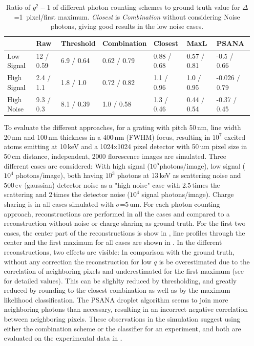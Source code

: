 \begin{table}
	\caption[Ratio of $g^2-1$ of different photon counting schemes to ground truth value]{Ratio of $g^2-1$ of different photon counting schemes to ground truth value  for $\Delta$=1\, pixel/first maximum. \textit{Closest} is \textit{Combination} without considering Noise photons, giving good results in the low noise cases.}
	\label{tab:photonrecon}
	
	\begin{adjustwidth}{-1em}{-2em}	
		\small
		\begin{tabular}{lllllll}
			\toprule
			&        Raw &       Threshold &         Combination &      Closest &         MaxL &          PSANA \\
			\midrule
			Low Signal  &  12 / 0.59 &  6.9 / 0.64 &  0.62 / 0.79 &  0.88 / 0.68 &  0.57 / 0.81 &    -0.5 / 0.66 \\
			High Signal &  2.4 / 1.1 &   1.8 / 1.0 &  0.72 / 0.82 &   1.1 / 0.96 &   1.0 / 0.95 &  -0.026 / 0.79 \\
			High Noise  &  9.3 / 0.3 &  8.1 / 0.39 &   1.0 / 0.58 &   1.3 / 0.46 &  0.44 / 0.54 &   -0.37 / 0.45 \\
			\bottomrule
		\end{tabular}
	\end{adjustwidth}
\end{table}

To evaluate the different approaches, for a grating with pitch 50\,nm, line width 20\,nm and 100\,nm thickness in a 400\,nm (FWHM) focus, resulting in $10^7$ excited atoms emitting at 10\,keV and a 1024x1024 pixel detector with 50\,um pixel size in 50\,cm distance, independent, 2000 florescence images are simulated. Three different cases are considered: With high signal ($10^5 $photons/image), low signal ($10^4$ photons/image), both having $10^3$ photons at 13\,keV as scattering noise and 500\,ev (gaussian) detector noise as a "high noise" case  with 2.5\,times the scattering and 2\,times the detector noise  ($10^4$ signal photons/image). Charge sharing is in all cases simulated with $\sigma$=5\,um.  For each photon counting approach, reconstructions are performed in all the cases and compared to a reconstruction without noise or charge sharing as ground truth. For the first two cases, the center part of the reconstructions is show in , line profiles through the center and the first maximum for all cases are shown in . In the different reconstructions, two effects are visible: In comparison with the ground truth, without any correction the reconstruction for low $q$ is be overestimated due to the correlation of neighboring pixels and underestimated for the first maximum (see  for detailed values). This can be slighlty reduced by thresholding, and greatly reduced by rounding to the closest combination as well as by the maximum likelihood classification. The PSANA droplet algorithm seems to join more neighboring photons than necessary, resulting in an incorrect negative correlation between neighboring pixels.  These observations in the simulation suggest using either the combination scheme or the classifier for an experiment, and both are evaluated on the experimental data in .

